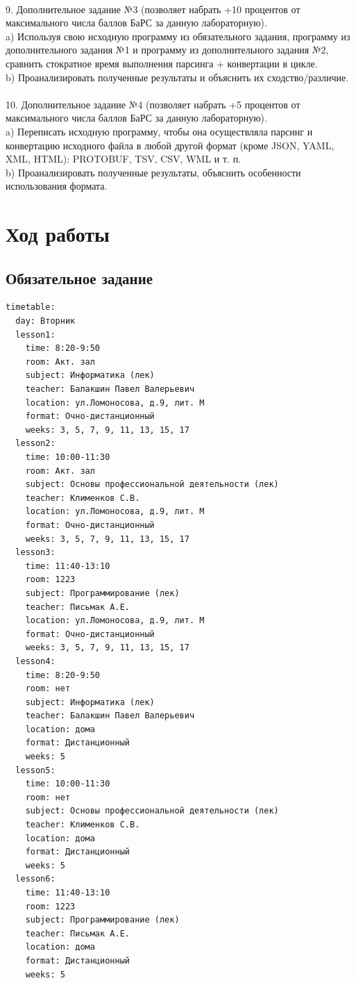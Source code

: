 \documentclass[12pt]{article}
\begin{document}
\\
9. Дополнительное задание №3 (позволяет набрать +10 процентов от максимального числа баллов БаРС за данную лабораторную).\\
\indent a) Используя свою исходную программу из обязательного задания, программу из дополнительного задания №1 и программу из дополнительного задания №2, сравнить стократное время выполнения парсинга + конвертации в цикле.\\
\indent b) Проанализировать полученные результаты и объяснить их сходство/различие.\\
\\
10. Дополнительное задание №4 (позволяет набрать +5 процентов от максимального числа баллов БаРС за данную лабораторную).\\
\indent a) Переписать исходную программу, чтобы она осуществляла парсинг и конвертацию исходного файла в любой другой формат (кроме JSON, YAML, XML, HTML): PROTOBUF, TSV, CSV, WML и т. п.\\
\indent b) Проанализировать полученные результаты, объяснить особенности использования формата.\\

\newpage

\section{Ход работы}
\subsection{Обязательное задание}

\begin{footnotesize}
\begin{verbatim}
timetable: 
  day: Вторник 
  lesson1: 
    time: 8:20-9:50 
    room: Акт. зал 
    subject: Информатика (лек) 
    teacher: Балакшин Павел Валерьевич 
    location: ул.Ломоносова, д.9, лит. М 
    format: Очно-дистанционный 
    weeks: 3, 5, 7, 9, 11, 13, 15, 17 
  lesson2: 
    time: 10:00-11:30 
    room: Акт. зал 
    subject: Основы профессиональной деятельности (лек) 
    teacher: Клименков С.В. 
    location: ул.Ломоносова, д.9, лит. М 
    format: Очно-дистанционный 
    weeks: 3, 5, 7, 9, 11, 13, 15, 17 
  lesson3: 
    time: 11:40-13:10 
    room: 1223 
    subject: Программирование (лек) 
    teacher: Письмак А.Е. 
    location: ул.Ломоносова, д.9, лит. М 
    format: Очно-дистанционный 
    weeks: 3, 5, 7, 9, 11, 13, 15, 17 
  lesson4: 
    time: 8:20-9:50 
    room: нет 
    subject: Информатика (лек) 
    teacher: Балакшин Павел Валерьевич 
    location: дома 
    format: Дистанционный 
    weeks: 5 
  lesson5: 
    time: 10:00-11:30 
    room: нет 
    subject: Основы профессиональной деятельности (лек) 
    teacher: Клименков С.В. 
    location: дома 
    format: Дистанционный 
    weeks: 5 
  lesson6: 
    time: 11:40-13:10 
    room: 1223 
    subject: Программирование (лек) 
    teacher: Письмак А.Е. 
    location: дома 
    format: Дистанционный 
    weeks: 5
\end{verbatim}
\end{footnotesize}
\end{document}

